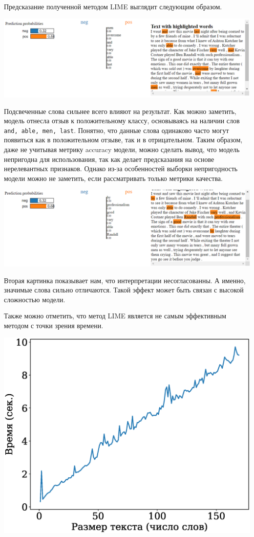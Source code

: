 \documentclass[a4paper, 12pt]{article}
\begin{document}
Предсказание полученной методом LIME выглядит следующим образом.

\includegraphics[width=\textwidth]{figures/lime_exp.png}

Подсвеченные слова сильнее всего влияют на результат. Как можно заметить, модель отнесла отзыв к положительному классу, основываясь на наличии слов \texttt{and, able, men, last}. Понятно, что данные слова одинаково часто могут появиться как в положительном отзыве, так и в отрицательном. Таким образом, даже не учитывая метрику accuracy модели, можно сделать вывод, что модель непригодна для использования, так как делает предсказания на основе нерелевантных признаков. Однако из-за особенностей выборки непригодность модели можно не заметить, если рассматривать только метрики качества. 

\includegraphics[width=\textwidth]{figures/lime_exp2.png}

Вторая картинка показывает нам, что интерпретации несогласованны. А именно, значимые слова сильно отличаются. Такой эффект может быть связан с высокой сложностью модели.

Также можно отметить, что метод LIME является не самым эффективным методом с точки зрения времени.

\includegraphics[scale=0.5]{../figures/lime_time}
\end{document}
